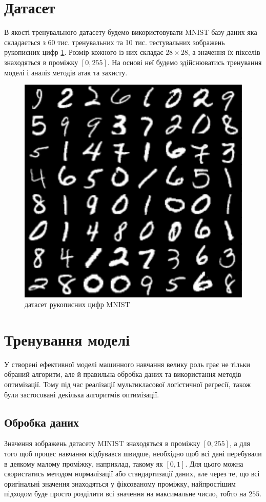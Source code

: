 \documentclass[a4paper,14pt]{extreport}
\begin{document}
	\section{Датасет}
	В якості тренувального датасету будемо використовувати MNIST базу даних яка складається з 60 тис. тренувальних та 10 тис. тестувальних зображень рукописних цифр \ref{fig:minist_dataset}. Розмір кожного із них складає $28 \times 28$, а значення їх пікселів знаходяться в проміжку $[0, 255]$. На основі неї будемо здійснюватись тренування моделі і аналіз методів атак та захисту.
	\begin{figure}[h]
		\centering
		\includegraphics[width=0.4 \textwidth]{resources/minist_dataset.pdf}
		\caption{датасет рукописних цифр MNIST}
		\label{fig:minist_dataset}
	\end{figure}

	
	\section{Тренування моделі}
	\label{sec:model}
	У створені ефективної моделі машинного навчання велику роль грає не тільки обраний алгоритм, але й правильна обробка даних та використання методів оптимізації. Тому під час реалізації мультикласової логістичної регресії, також були застосовані декілька алгоритмів оптимізації.
	
	\subsection{Обробка даних}
	Значення зображень датасету MINIST знаходяться в проміжку $[0, 255]$, а для того щоб процес навчання відбувався швидше, необхідно щоб всі дані перебували в деякому малому проміжку, наприклад, такому як $[0, 1]$. Для цього можна скористатись методом нормалізації або стандартизації даних, але через те, що всі оригінальні значення знаходяться у фіксованому проміжку, найпростішим підходом буде просто розділити всі значення на максимальне число, тобто на $255$.
\end{document}
